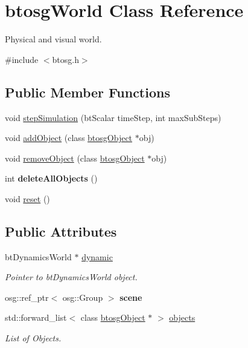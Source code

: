 \hypertarget{classbtosgWorld}{}\section{btosg\+World Class Reference}
\label{classbtosgWorld}


Physical and visual world.  




{\ttfamily \#include $<$btosg.\+h$>$}

\subsection*{Public Member Functions}
\begin{DoxyCompactItemize}
\item 
void \mbox{\hyperlink{classbtosgWorld_afce096686d8f84afd8b8fa3f2dc161b8}{step\+Simulation}} (bt\+Scalar time\+Step, int max\+Sub\+Steps)
\item 
void \mbox{\hyperlink{classbtosgWorld_ae5b71c6319dd420479096a265a1725b7}{add\+Object}} (class \mbox{\hyperlink{classbtosgObject}{btosg\+Object}} $\ast$obj)
\item 
void \mbox{\hyperlink{classbtosgWorld_a09e7791013d2c3a63bb0fb5d96396a4f}{remove\+Object}} (class \mbox{\hyperlink{classbtosgObject}{btosg\+Object}} $\ast$obj)
\item 
\mbox{\label{classbtosgWorld_a7c66f3c4d54d60b61856b9455173cd01}} 
int {\bfseries delete\+All\+Objects} ()
\item 
void \mbox{\hyperlink{classbtosgWorld_a6af4d066410a86b44fff5563667ea9a9}{reset}} ()
\end{DoxyCompactItemize}
\subsection*{Public Attributes}
\begin{DoxyCompactItemize}
\item 
bt\+Dynamics\+World $\ast$ \mbox{\hyperlink{classbtosgWorld_ad757a7b3b845142f200d1f2127e5372e}{dynamic}}
\begin{DoxyCompactList}\small\item\em Pointer to bt\+Dynamics\+World object. \end{DoxyCompactList}\item 
\mbox{\label{classbtosgWorld_ab6d438f54ccfc18955ea43e87731e008}} 
osg\+::ref\+\_\+ptr$<$ osg\+::\+Group $>$ {\bfseries scene}
\item 
std\+::forward\+\_\+list$<$ class \mbox{\hyperlink{classbtosgObject}{btosg\+Object}} $\ast$ $>$ \mbox{\hyperlink{classbtosgWorld_ab105aa8c0f8bdbdf323d47b902f6aca0}{objects}}
\begin{DoxyCompactList}\small\item\em List of Objects. \end{DoxyCompactList}\end{DoxyCompactItemize}


